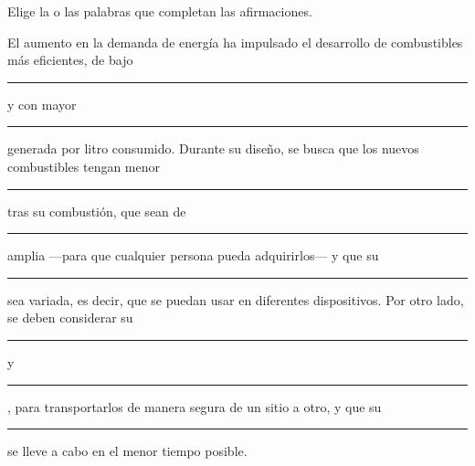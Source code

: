 Elige la o las palabras que completan las afirmaciones.
\begin{center}
     \quad {} \quad {} \quad
     \quad {} \quad {} \quad
     \quad {} \quad {} \quad
     \quad {} \quad {} \quad
\end{center}
El aumento en la demanda de energía ha impulsado el desarrollo de combustibles más eficientes, de bajo
\rule{3cm}{0.2mm} y con mayor \rule{3cm}{0.2mm} generada por litro consumido. Durante su diseño,
se busca que los nuevos combustibles tengan menor \rule{3cm}{0.2mm}
tras su combustión, que sean de \rule{3cm}{0.2mm} amplia —para que cualquier persona pueda adquirirlos— y que su
\rule{3cm}{0.2mm} sea variada, es decir, que se puedan usar en diferentes dispositivos. Por otro lado, se deben considerar su
\rule{3cm}{0.2mm} y \rule{3cm}{0.2mm}, para transportarlos de manera segura de un sitio a otro, y que su \rule{3cm}{0.2mm}
se lleve a cabo en el menor tiempo posible.